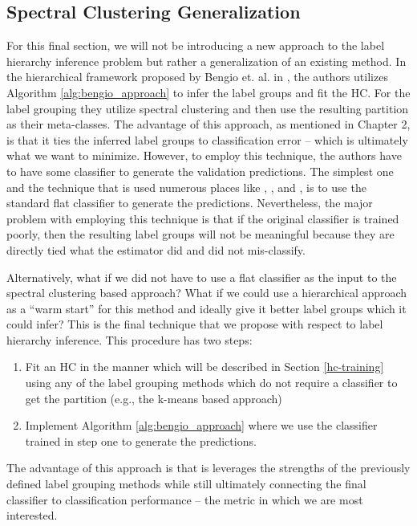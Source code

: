 \documentclass[../thesis.tex]{subfiles}
\begin{document}
\subsection{Spectral Clustering Generalization}
For this final section, we will not be introducing a new approach to the label hierarchy inference problem but rather a generalization of an existing method. In the hierarchical framework proposed by Bengio et. al. in \cite{bengio2010label}, the authors utilizes Algorithm \ref{alg:bengio_approach} to infer the label groups and fit the HC. For the label grouping they utilize spectral clustering and then use the resulting partition as their meta-classes. The advantage of this approach, as mentioned in Chapter 2, is that it ties the inferred label groups to classification error -- which is ultimately what we want to minimize. However, to employ this technique, the authors have to have some classifier to generate the validation predictions. The simplest one and the technique that is used numerous places like \cite{bengio2010label}, \cite{yan2015hd}, and \cite{wang2018learning}, is to use the standard flat classifier to generate the predictions. Nevertheless, the major problem with employing this technique is that if the original classifier is trained poorly, then the resulting label groups will not be meaningful because they are directly tied what the estimator did and did not mis-classify. 

Alternatively, what if we did not have to use a flat classifier as the input to the spectral clustering based approach? What if we could use a hierarchical approach as a ``warm start'' for this method and ideally give it better label groups which it could infer? This is the final technique that we propose with respect to label hierarchy inference. This procedure has two steps:
\begin{enumerate}
    \item Fit an HC in the manner which will be described in Section \ref{hc-training} using any of the label grouping methods which do not require a classifier to get the partition (e.g., the k-means based approach)
    \item Implement Algorithm \ref{alg:bengio_approach} where we use the classifier trained in step one to generate the predictions.
\end{enumerate}

The advantage of this approach is that is leverages the strengths of the previously defined label grouping methods while still ultimately connecting the final classifier to classification performance -- the metric in which we are most interested. 
\end{document}
